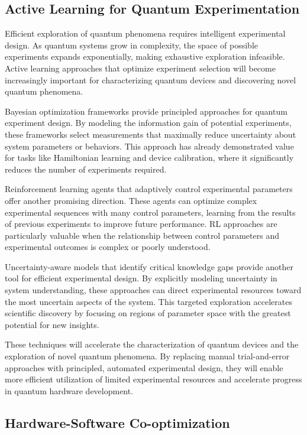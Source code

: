 \subsection{Active Learning for Quantum Experimentation}

Efficient exploration of quantum phenomena requires intelligent experimental design. As quantum systems grow in complexity, the space of possible experiments expands exponentially, making exhaustive exploration infeasible. Active learning approaches that optimize experiment selection will become increasingly important for characterizing quantum devices and discovering novel quantum phenomena.

Bayesian optimization frameworks provide principled approaches for quantum experiment design. By modeling the information gain of potential experiments, these frameworks select measurements that maximally reduce uncertainty about system parameters or behaviors. This approach has already demonstrated value for tasks like Hamiltonian learning and device calibration, where it significantly reduces the number of experiments required.

Reinforcement learning agents that adaptively control experimental parameters offer another promising direction. These agents can optimize complex experimental sequences with many control parameters, learning from the results of previous experiments to improve future performance. RL approaches are particularly valuable when the relationship between control parameters and experimental outcomes is complex or poorly understood.

Uncertainty-aware models that identify critical knowledge gaps provide another tool for efficient experimental design. By explicitly modeling uncertainty in system understanding, these approaches can direct experimental resources toward the most uncertain aspects of the system. This targeted exploration accelerates scientific discovery by focusing on regions of parameter space with the greatest potential for new insights.

These techniques will accelerate the characterization of quantum devices and the exploration of novel quantum phenomena. By replacing manual trial-and-error approaches with principled, automated experimental design, they will enable more efficient utilization of limited experimental resources and accelerate progress in quantum hardware development.

\subsection{Hardware-Software Co-optimization}

